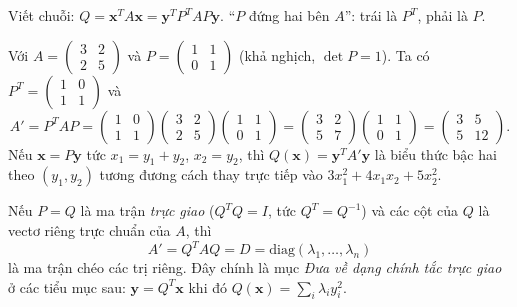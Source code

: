 \documentclass[12pt,a4paper]{article}
\begin{document}
\begin{phuongphap}[title={Cách nhớ công thức $A' = P^T A P$}]
Viết chuỗi: $Q = \mathbf{x}^T A \mathbf{x} = \mathbf{y}^T P^T A P \mathbf{y}$. ``$P$ đứng hai bên $A$'': trái là $P^T$, phải là $P$.
\end{phuongphap}

\begin{vidu}[title={Đổi cơ sở $2 \times 2$}]
Với $A = \begin{pmatrix}3 & 2\\ 2 & 5\end{pmatrix}$ và $P = \begin{pmatrix}1 & 1\\ 0 & 1\end{pmatrix}$ (khả nghịch, $\det P = 1$). Ta có $P^T = \begin{pmatrix}1 & 0\\ 1 & 1\end{pmatrix}$ và
\[
  A' = P^T A P
  = \begin{pmatrix}1 & 0\\ 1 & 1\end{pmatrix}
    \begin{pmatrix}3 & 2\\ 2 & 5\end{pmatrix}
    \begin{pmatrix}1 & 1\\ 0 & 1\end{pmatrix}
  = \begin{pmatrix}3 & 2\\ 5 & 7\end{pmatrix}
    \begin{pmatrix}1 & 1\\ 0 & 1\end{pmatrix}
  = \begin{pmatrix}3 & 5\\ 5 & 12\end{pmatrix}.
\]
Nếu $\mathbf{x} = P\mathbf{y}$ tức $x_1 = y_1 + y_2$, $x_2 = y_2$, thì $Q(\mathbf{x}) = \mathbf{y}^T A' \mathbf{y}$ là biểu thức bậc hai theo $(y_1, y_2)$ tương đương cách thay trực tiếp vào $3x_1^2 + 4x_1 x_2 + 5x_2^2$.
\end{vidu}

\begin{ynghia}[title={Trường hợp $P$ trực giao: chéo hoá dạng toàn phương}]
Nếu $P = Q$ là ma trận \emph{trực giao} ($Q^T Q = I$, tức $Q^T = Q^{-1}$) và các cột của $Q$ là vectơ riêng trực chuẩn của $A$, thì
\[
  A' = Q^T A Q = D = \mathrm{diag}(\lambda_1, \ldots, \lambda_n)
\]
là ma trận chéo các trị riêng. Đây chính là mục \emph{Đưa về dạng chính tắc trực giao} ở các tiểu mục sau: $\mathbf{y} = Q^T \mathbf{x}$ khi đó $Q(\mathbf{x}) = \sum_i \lambda_i y_i^2$.
\end{ynghia}
\end{document}
